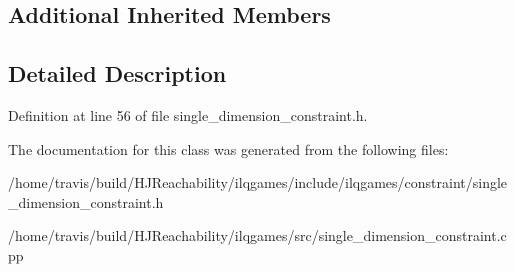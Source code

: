 \subsection*{Additional Inherited Members}


\subsection{Detailed Description}


Definition at line 56 of file single\+\_\+dimension\+\_\+constraint.\+h.



The documentation for this class was generated from the following files\+:\begin{DoxyCompactItemize}
\item 
/home/travis/build/\+H\+J\+Reachability/ilqgames/include/ilqgames/constraint/single\+\_\+dimension\+\_\+constraint.\+h\item 
/home/travis/build/\+H\+J\+Reachability/ilqgames/src/single\+\_\+dimension\+\_\+constraint.\+cpp\end{DoxyCompactItemize}
